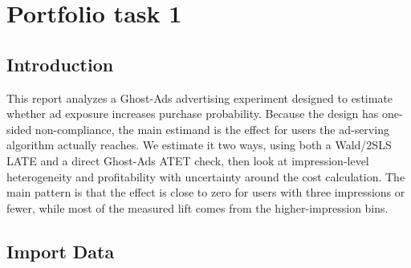 
\section{Portfolio task 1}

\subsection{Introduction}

This report analyzes a Ghost-Ads advertising experiment designed to
estimate whether ad exposure increases purchase probability. Because the
design has one-sided non-compliance, the main estimand is the effect for
users the ad-serving algorithm actually reaches. We estimate it two
ways, using both a Wald/2SLS LATE and a direct Ghost-Ads ATET check,
then look at impression-level heterogeneity and profitability with
uncertainty around the cost calculation. The main pattern is that the
effect is close to zero for users with three impressions or fewer, while
most of the measured lift comes from the higher-impression bins.

\subsection{Import Data}

